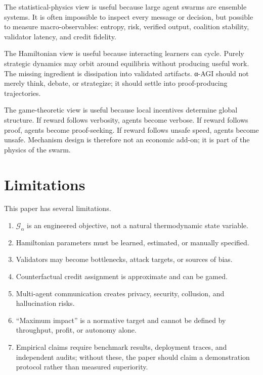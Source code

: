 \documentclass[
  11pt,
]{article}
\providecommand{\tightlist}{%
  \setlength{\itemsep}{0pt}\setlength{\parskip}{0pt}}
\begin{document}
The statistical-physics view is useful because large agent swarms are
ensemble systems. It is often impossible to inspect every message or
decision, but possible to measure macro-observables: entropy, risk,
verified output, coalition stability, validator latency, and credit
fidelity.

The Hamiltonian view is useful because interacting learners can cycle.
Purely strategic dynamics may orbit around equilibria without producing
useful work. The missing ingredient is dissipation into validated
artifacts. α-AGI should not merely think, debate, or strategize; it
should settle into proof-producing trajectories.

The game-theoretic view is useful because local incentives determine
global structure. If reward follows verbosity, agents become verbose. If
reward follows proof, agents become proof-seeking. If reward follows
unsafe speed, agents become unsafe. Mechanism design is therefore not an
economic add-on; it is part of the physics of the swarm.

\section{Limitations}\label{limitations}

This paper has several limitations.

\begin{enumerate}
\def\labelenumi{\arabic{enumi}.}
\tightlist
\item
  \(\mathcal{G}_{\alpha}\) is an engineered objective, not a natural
  thermodynamic state variable.
\item
  Hamiltonian parameters must be learned, estimated, or manually
  specified.
\item
  Validators may become bottlenecks, attack targets, or sources of bias.
\item
  Counterfactual credit assignment is approximate and can be gamed.
\item
  Multi-agent communication creates privacy, security, collusion, and
  hallucination risks.
\item
  ``Maximum impact'' is a normative target and cannot be defined by
  throughput, profit, or autonomy alone.
\item
  Empirical claims require benchmark results, deployment traces, and
  independent audits; without these, the paper should claim a
  demonstration protocol rather than measured superiority.
\end{enumerate}
\end{document}
